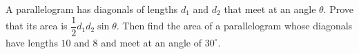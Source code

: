 A parallelogram has diagonals of lengths $d_1$ and $d_2$ that meet at an angle $\theta$. Prove that its area is $\dfrac{1}{2}d_1d_2\sin\theta$. Then find the area of a parallelogram whose diagonals have lengths $10$ and $8$ and meet at an angle of $30^\circ$.
